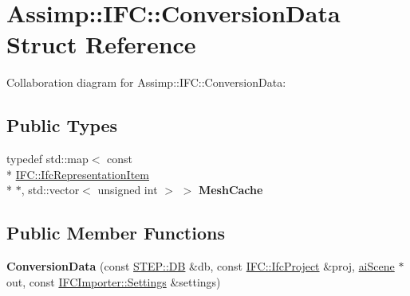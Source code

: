 \hypertarget{struct_assimp_1_1_i_f_c_1_1_conversion_data}{\section{Assimp\+:\+:I\+F\+C\+:\+:Conversion\+Data Struct Reference}
\label{struct_assimp_1_1_i_f_c_1_1_conversion_data}
}


Collaboration diagram for Assimp\+:\+:I\+F\+C\+:\+:Conversion\+Data\+:
\subsection*{Public Types}
\begin{DoxyCompactItemize}
\item 
\hypertarget{struct_assimp_1_1_i_f_c_1_1_conversion_data_ae6e7765fc953a05b52467867ea2839c7}{typedef std\+::map$<$ const \\*
\hyperlink{struct_assimp_1_1_i_f_c_1_1_ifc_representation_item}{I\+F\+C\+::\+Ifc\+Representation\+Item} \\*
$\ast$, std\+::vector$<$ unsigned int $>$ $>$ {\bfseries Mesh\+Cache}}\label{struct_assimp_1_1_i_f_c_1_1_conversion_data_ae6e7765fc953a05b52467867ea2839c7}

\end{DoxyCompactItemize}
\subsection*{Public Member Functions}
\begin{DoxyCompactItemize}
\item 
\hypertarget{struct_assimp_1_1_i_f_c_1_1_conversion_data_a3d8138e6397a3320acebe7a44c1ece85}{{\bfseries Conversion\+Data} (const \hyperlink{class_assimp_1_1_s_t_e_p_1_1_d_b}{S\+T\+E\+P\+::\+D\+B} \&db, const \hyperlink{struct_assimp_1_1_i_f_c_1_1_ifc_project}{I\+F\+C\+::\+Ifc\+Project} \&proj, \hyperlink{structai_scene}{ai\+Scene} $\ast$out, const \hyperlink{struct_assimp_1_1_i_f_c_importer_1_1_settings}{I\+F\+C\+Importer\+::\+Settings} \&settings)}\label{struct_assimp_1_1_i_f_c_1_1_conversion_data_a3d8138e6397a3320acebe7a44c1ece85}

\end{DoxyCompactItemize}
